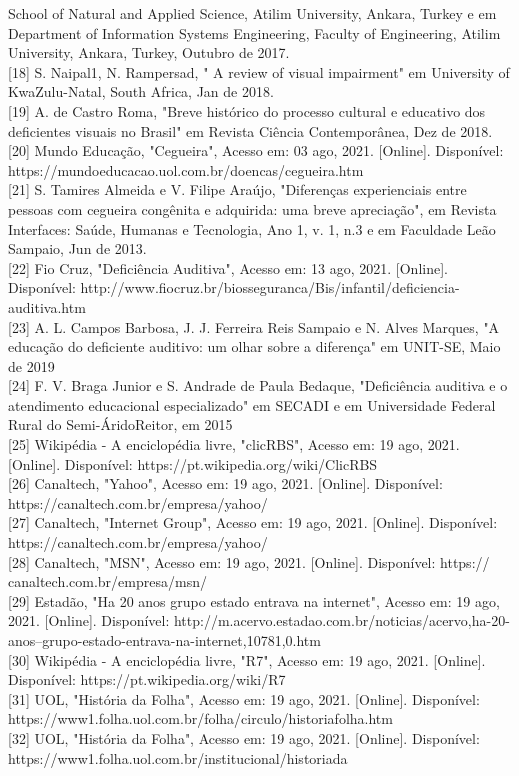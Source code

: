 \documentclass[a4paper]{article}
\begin{document}
\begin{titlepage}
School of Natural and Applied Science, Atilim University, Ankara, Turkey e em Department of Information Systems Engineering, Faculty of Engineering, Atilim University, Ankara, Turkey, Outubro de 2017.\\[0.5cm] [18] S. Naipal1, N. Rampersad, " A review of visual impairment" em University of KwaZulu-Natal, South Africa, Jan de 2018.\\[0.5cm] [19] A. de Castro Roma, "Breve histórico do processo cultural e educativo dos deficientes visuais no Brasil" em Revista Ciência Contemporânea, Dez de 2018.\\[0.5cm] [20] Mundo Educação, "Cegueira", Acesso em: 03 ago, 2021. [Online]. Disponível: https://mundoeducacao.uol.com.br/doencas/cegueira.htm\\[0.5cm] [21] S. Tamires Almeida e V. Filipe Araújo, "Diferenças experienciais entre pessoas com cegueira congênita e adquirida: uma breve apreciação", em Revista Interfaces: Saúde, Humanas e Tecnologia, Ano 1, v. 1, n.3 e em Faculdade Leão Sampaio, Jun de 2013.\\[0.5cm] [22] Fio Cruz, "Deficiência Auditiva", Acesso em: 13 ago, 2021. [Online]. Disponível: http://www.fiocruz.br/biosseguranca/Bis/infantil/deficiencia-auditiva.htm\\[0.5cm] [23] A. L. Campos Barbosa, J. J. Ferreira Reis Sampaio e N. Alves Marques, "A educação do deficiente auditivo: um olhar sobre a diferença" em UNIT-SE, Maio de 2019\\[0.5cm] [24] F. V. Braga Junior e S. Andrade de Paula Bedaque, "Deficiência auditiva e o atendimento educacional especializado" em SECADI e em Universidade Federal Rural do Semi-ÁridoReitor, em 2015\\[0.5cm] [25] Wikipédia - A enciclopédia livre, "clicRBS", Acesso em: 19 ago, 2021. [Online]. Disponível: https://pt.wikipedia.org/wiki/ClicRBS\\[0.5cm] [26] Canaltech, "Yahoo", Acesso em: 19 ago, 2021. [Online]. Disponível: https://canaltech.com.br/empresa/yahoo/\\[0.5cm] [27] Canaltech, "Internet Group", Acesso em: 19 ago, 2021. [Online]. Disponível: https://canaltech.com.br/empresa/yahoo/\\[0.5cm] [28] Canaltech, "MSN", Acesso em: 19 ago, 2021. [Online]. Disponível: https:// canaltech.com.br/empresa/msn/\\[0.5cm] [29] Estadão, "Ha 20 anos grupo estado entrava na internet", Acesso em: 19 ago, 2021. [Online]. Disponível: http://m.acervo.estadao.com.br/noticias/acervo,ha-20-anos--grupo-estado-entrava-na-internet,10781,0.htm\\[0.5cm] [30] Wikipédia - A enciclopédia livre, "R7", Acesso em: 19 ago, 2021. [Online]. Disponível: https://pt.wikipedia.org/wiki/R7\\[0.5cm] [31] UOL, "História da Folha", Acesso em: 19 ago, 2021. [Online]. Disponível: https://www1.folha.uol.com.br/folha/circulo/historia\textunderscore folha.htm\\[0.5cm] [32] UOL, "História da Folha", Acesso em: 19 ago, 2021. [Online]. Disponível: https://www1.folha.uol.com.br/institucional/historia\textunderscore da\textunderscore 
\end{titlepage}
\end{document}
